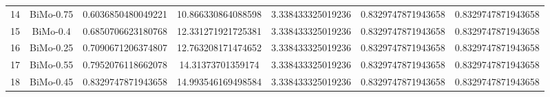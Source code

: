 \documentclass[a4paper,10pt]{article}
\begin{document}
\begin{landscape}
\begin{table}[!htp]
\begin{tabular}{ccccccc}
14&BiMo-0.75&0.6036850480049221&10.866330864088598&3.338433325019236&0.8329747871943658&0.8329747871943658\\
15&BiMo-0.4&0.6850706623180768&12.331271921725381&3.338433325019236&0.8329747871943658&0.8329747871943658\\
16&BiMo-0.25&0.7090671206374807&12.763208171474652&3.338433325019236&0.8329747871943658&0.8329747871943658\\
17&BiMo-0.55&0.7952076118662078&14.31373701359174&3.338433325019236&0.8329747871943658&0.8329747871943658\\
18&BiMo-0.45&0.8329747871943658&14.993546169498584&3.338433325019236&0.8329747871943658&0.8329747871943658\\
\hline
\end{tabular}
\end{table}


\end{landscape}
\end{document}
